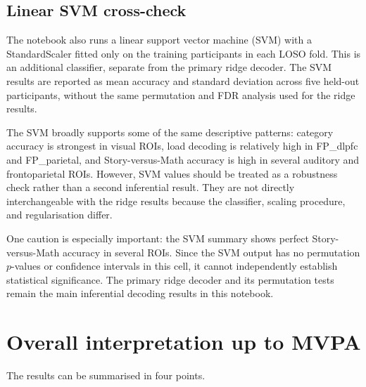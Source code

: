 \documentclass[11pt,a4paper]{article}
\begin{document}
\subsection{Linear SVM cross-check}

The notebook also runs a linear support vector machine (SVM) with a StandardScaler fitted only on the training participants in each LOSO fold. This is an additional classifier, separate from the primary ridge decoder. The SVM results are reported as mean accuracy and standard deviation across five held-out participants, without the same permutation and FDR analysis used for the ridge results.

The SVM broadly supports some of the same descriptive patterns: category accuracy is strongest in visual ROIs, load decoding is relatively high in FP\_dlpfc and FP\_parietal, and Story-versus-Math accuracy is high in several auditory and frontoparietal ROIs. However, SVM values should be treated as a robustness check rather than a second inferential result. They are not directly interchangeable with the ridge results because the classifier, scaling procedure, and regularisation differ.

One caution is especially important: the SVM summary shows perfect Story-versus-Math accuracy in several ROIs. Since the SVM output has no permutation \(p\)-values or confidence intervals in this cell, it cannot independently establish statistical significance. The primary ridge decoder and its permutation tests remain the main inferential decoding results in this notebook.

\section{Overall interpretation up to MVPA}

The results can be summarised in four points.
\end{document}
